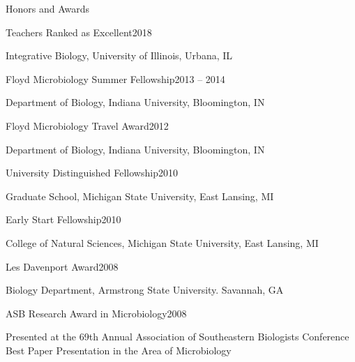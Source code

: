 \documentclass{resume} %
\begin{document}
\begin{rSection}{Honors and Awards}

    \begin{rSubsection}{Teachers Ranked as Excellent}{2018}{}{}
      \item Integrative Biology, University of Illinois, Urbana, IL
    \end{rSubsection}

    \begin{rSubsection}{Floyd Microbiology Summer Fellowship}{2013 -- 2014}{}{}
      \item Department of Biology, Indiana University, Bloomington, IN
    \end{rSubsection}

    \begin{rSubsection}{Floyd Microbiology Travel Award}{2012}{}{}
      \item Department of Biology, Indiana University, Bloomington, IN
    \end{rSubsection}

    \begin{rSubsection}{University Distinguished Fellowship}{2010}{}{}
      \item Graduate School, Michigan State University, East Lansing, MI
    \end{rSubsection}

    \begin{rSubsection}{Early Start Fellowship}{2010}{}{}
      \item College of Natural Sciences, Michigan State University, East
      Lansing, MI
    \end{rSubsection}

    \begin{rSubsection}{Les Davenport Award}{2008}{}{}
      \item Biology Department, Armstrong State University. Savannah, GA
    \end{rSubsection}

    \begin{rSubsection}{ASB Research Award in Microbiology}{2008}{}{}
      \item Presented at the 69th Annual Association of Southeastern Biologists
      Conference \\
      Best Paper Presentation in the Area of Microbiology
    \end{rSubsection}


\end{rSection}
\end{document}
